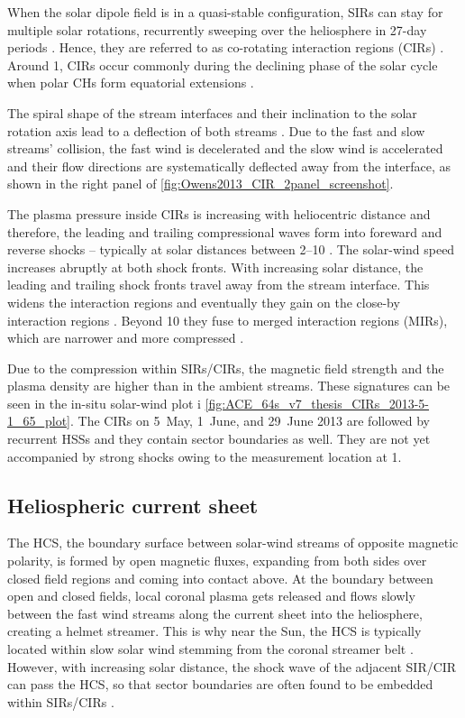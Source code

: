 When the solar dipole field is in a quasi-stable configuration, SIRs can stay for multiple solar rotations, recurrently sweeping over the heliosphere in 27-day periods \citep{Gosling1972}. Hence, they are referred to as co-rotating interaction regions (CIRs) \citep{Smith1976,Balogh1999}.
Around \SI{1}{\au}, CIRs occur commonly during the declining phase of the solar cycle when polar CHs form equatorial extensions \citep{Balogh2009}.

The spiral shape of the stream interfaces and their inclination to the solar rotation axis lead to a deflection of both streams \citep{Balogh2009}. Due to the fast and slow streams' collision, the fast wind is decelerated and the slow wind is accelerated and their flow directions are systematically deflected away from the interface, as shown in the right panel of \autoref{fig:Owens2013_CIR_2panel_screenshot}.

The plasma pressure inside CIRs is increasing with heliocentric distance and therefore, the leading and trailing compressional waves form into foreward and reverse shocks -- typically at solar distances between \SIrange{2}{10}{\au} \citep{Smith1976,Balogh2009}. The solar-wind speed increases abruptly at both shock fronts.
With increasing solar distance, the leading and trailing shock fronts travel away from the stream interface. This widens the interaction regions and eventually they gain on the close-by interaction regions \citep{Burlaga1984}. Beyond \SI{10}{\au} they fuse to merged interaction regions (MIRs), which are narrower and more compressed \citep{Burlaga1985}.

Due to the compression within SIRs/CIRs, the magnetic field strength and the plasma density are higher than in the ambient streams. These signatures can be seen in the in-situ solar-wind plot i \autoref{fig:ACE_64s_v7_thesis_CIRs_2013-5-1_65_plot}. The CIRs on 5~May, 1~June, and 29~June 2013 are followed by recurrent HSSs and they contain sector boundaries as well. They are not yet accompanied by strong shocks owing to the measurement location at \SI{1}{\au}.


\subsection{Heliospheric current sheet}
The HCS, the boundary surface between solar-wind streams of opposite magnetic polarity, is formed by open magnetic fluxes, expanding from both sides over closed field regions and coming into contact above. At the boundary between open and closed fields, local coronal plasma gets released and flows slowly between the fast wind streams along the current sheet into the heliosphere, creating a helmet streamer. This is why near the Sun, the HCS is typically located within slow solar wind stemming from the coronal streamer belt \citet{Owens2013}. However, with increasing solar distance, the shock wave of the adjacent SIR/CIR can pass the HCS, so that sector boundaries are often found to be embedded within SIRs/CIRs \citep{Gosling1999}.

